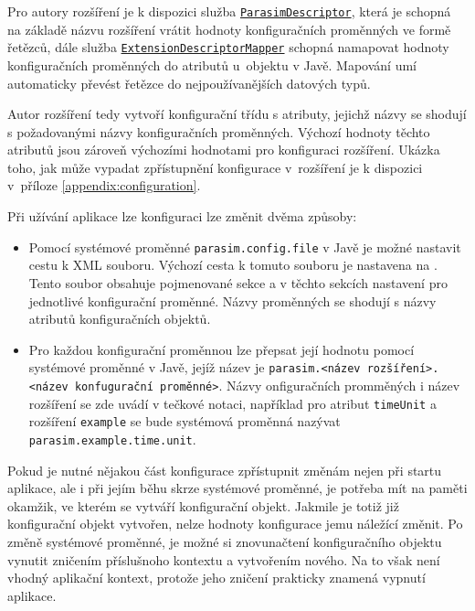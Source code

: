 Pro autory rozšíření je k dispozici služba \href{https://github.com/sybila/parasim/blob/2.0.0.Final/core/src/main/java/org/sybila/parasim/core/api/configuration/ParasimDescriptor.java}{\texttt{ParasimDescriptor}},
která je schopná na základě názvu rozšíření vrátit hodnoty konfiguračních pro\-měn\-ných
ve formě řetězců, dále služba \href{https://github.com/sybila/parasim/blob/2.0.0.Final/core/src/main/java/org/sybila/parasim/core/api/configuration/ExtensionDescriptorMapper.java}{\texttt{ExtensionDescriptorMapper}} schopná namapovat hodnoty konfiguračních pro\-měn\-ných
do atributů u~objektu v Javě. Mapování umí automaticky převést řetězce
do nej\-pou\-ží\-va\-něj\-ších datových typů.

Autor rozšíření tedy vytvoří konfigurační třídu s atributy, jejichž názvy se shodují
s požadovanými názvy konfiguračních proměnných. Výchozí hodnoty těchto atributů jsou
zároveň výchozími hodnotami pro konfiguraci rozšíření. Ukázka toho, jak může vypadat
zpřístupnění konfigurace v~rozšíření je k dispozici v~příloze \ref{appendix:configuration}.

Při užívání aplikace lze konfiguraci lze změnit dvěma způsoby:

\begin{itemize}
	\item	Pomocí systémové proměnné \texttt{parasim.config.file} v Javě je mož\-né nastavit cestu k XML souboru.
			Výchozí cesta k tomuto souboru je nastavena na . Tento soubor
			obsahuje pojmenované sekce a v těchto sekcích nastavení pro jednotlivé konfigurační
			pro\-měn\-né. Názvy proměnných se shodují s názvy atributů konfiguračních objektů.

	\item	Pro každou konfigurační proměnnou lze přepsat její hodnotu pomocí systémové
			proměnné v Javě, jejíž název je \texttt{parasim.<název roz\-ší\-ření>.<název konfugurační proměnné>}.
			Názvy on\-fi\-gu\-rač\-ních promměných i název rozšíření se zde uvádí v tečkové notaci, například pro atribut \texttt{timeUnit}
			a rozšíření \texttt{example} se bude sys\-té\-mo\-vá proměnná nazývat \texttt{parasim.example.time.unit}.
\end{itemize}

Pokud je nutné nějakou část konfigurace zpřístupnit
změnám nejen při startu aplikace, ale i při jejím běhu skrze systémové proměnné, je potřeba mít na paměti
okamžik, ve kterém se vytváří konfigurační objekt. Jakmile je totiž již konfigurační objekt vytvořen,
nelze hodnoty konfigurace jemu náležící změnit. Po změně systémové proměnné,
je možné si znovunačtení konfiguračního objektu vynutit zničením příslušnoho kontextu
a vy\-tvo\-ře\-ním nového. Na to však není vhodný aplikační kontext, protože jeho
zničení prakticky znamená vypnutí aplikace.

